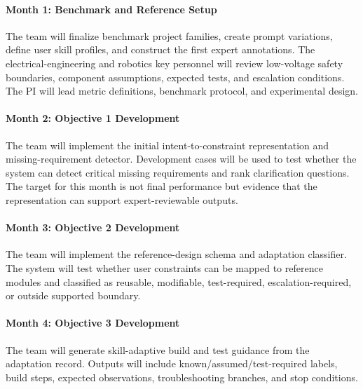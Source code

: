 \vspace{-10pt}
\paragraph{Month 1: Benchmark and Reference Setup}

The team will finalize benchmark project families, create prompt variations, define user skill profiles, and construct the first expert annotations. The electrical-engineering and robotics key personnel will review low-voltage safety boundaries, component assumptions, expected tests, and escalation conditions. The PI will lead metric definitions, benchmark protocol, and experimental design.

\vspace{-10pt}
\paragraph{Month 2: Objective 1 Development}

The team will implement the initial intent-to-constraint representation and missing-requirement detector. Development cases will be used to test whether the system can detect critical missing requirements and rank clarification questions. The target for this month is not final performance but evidence that the representation can support expert-reviewable outputs.

\vspace{-10pt}
\paragraph{Month 3: Objective 2 Development}

The team will implement the reference-design schema and adaptation classifier. The system will test whether user constraints can be mapped to reference modules and classified as reusable, modifiable, test-required, escalation-required, or outside supported boundary.

\vspace{-10pt}
\paragraph{Month 4: Objective 3 Development}

The team will generate skill-adaptive build and test guidance from the adaptation record. Outputs will include known/assumed/test-required labels, build steps, expected observations, troubleshooting branches, and stop conditions.

